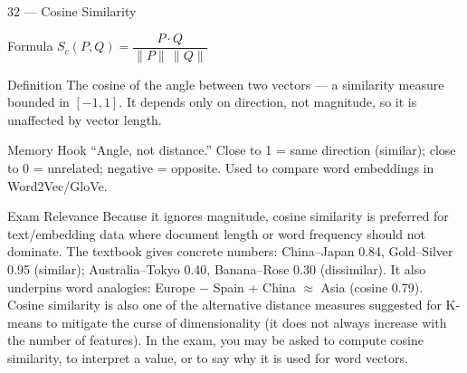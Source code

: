 \documentclass[aspectratio=169,8pt]{beamer}
\begin{document}
	\begin{frame}{32 --- Cosine Similarity}
		\begin{block}{Formula}
			$S_c(P,Q) = \dfrac{P \cdot Q}{\|P\|\,\|Q\|}$
		\end{block}
		\begin{block}{Definition}
			The cosine of the angle between two vectors --- a similarity measure bounded in $[-1, 1]$. It depends only on direction, not magnitude, so it is unaffected by vector length.
		\end{block}
		\begin{block}{Memory Hook}
			``Angle, not distance.'' Close to 1 = same direction (similar); close to 0 = unrelated; negative = opposite. Used to compare word embeddings in Word2Vec/GloVe.
		\end{block}
		\begin{block}{Exam Relevance}
			Because it ignores magnitude, cosine similarity is preferred for text/embedding data where document length or word frequency should not dominate. The textbook gives concrete numbers: China--Japan 0.84, Gold--Silver 0.95 (similar); Australia--Tokyo 0.40, Banana--Rose 0.30 (dissimilar). It also underpins word analogies: Europe $-$ Spain + China $\approx$ Asia (cosine 0.79). Cosine similarity is also one of the alternative distance measures suggested for K-means to mitigate the curse of dimensionality (it does not always increase with the number of features). In the exam, you may be asked to compute cosine similarity, to interpret a value, or to say why it is used for word vectors.
		\end{block}
	\end{frame}
	
\end{document}
